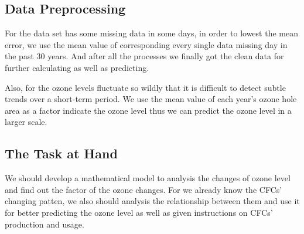\documentclass[12pt]{article}
\begin{document}
\subsection{Data Preprocessing}
For the data set has some missing data in some days, in order to lowest the mean error, we use the mean value of corresponding  every single data missing day in the past 30 years. And after all the processes we finally got the clean data for further calculating as well as predicting. 

Also, for the ozone levels fluctuate so wildly that it is difficult to detect subtle trends over a short-term period. We use the mean value of each year's ozone hole area as a factor indicate the ozone level thus we can predict the ozone level  in a larger scale.
\subsection{The Task at Hand}
We should develop a mathematical model to analysis the changes of ozone level and find out the factor of the ozone changes.  For we already know the CFCs' changing patten, we also should analysis the relationship between them and use it for better predicting the ozone level as well as given instructions on CFCs' production and usage.
\end{document}
